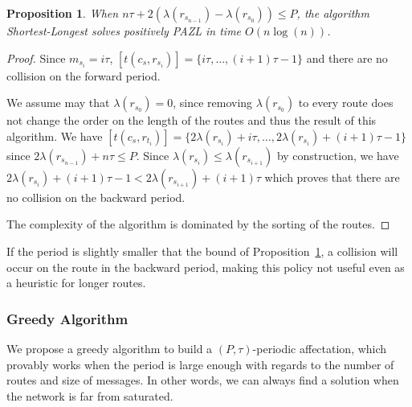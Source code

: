 \documentclass[a4paper,10pt]{article}
\newtheorem{proposition}{Proposition}
\begin{document}
      
      \begin{proposition} When $n\tau + 2(\lambda(r_{s_{n-1}}) - \lambda(r_{s_0})) \leq P$,
      the algorithm Shortest-Longest solves positively PAZL in time $O(n\log(n))$.\label{prop:SL}
      \end{proposition}
      \begin{proof}
       Since $m_{s_i} = i\tau$, $[t(c_s,r_{s_i})] = \{i\tau,\dots, (i+1)\tau -1\}$ and there are no collision on the forward period.
       
       
       We assume may that $\lambda(r_{s_0}) = 0$, since removing $\lambda(r_{s_0})$ to every route does not change the order on the length of the routes and thus the result of this algorithm.
      We have  $[t(c_s,r_{t_i})] = \{2 \lambda(r_{s_i}) + i\tau, \dots,  2 \lambda(r_{s_i}) + (i+1)\tau -1\}$ since $2 \lambda(r_{s_{n-1 }}) + n\tau \leq P$.
       Since $ \lambda(r_{s_i}) \leq  \lambda(r_{s_{i+1}})$ by construction, we have  $2 \lambda(r_{s_i}) + (i+1)\tau -1 < 2 \lambda(r_{s_{i+1}}) + (i+1)\tau$ which proves that there are no collision on the backward period. 
       
       The complexity of the algorithm is dominated by the sorting of the routes. 
      \end{proof}

      
      If the period is slightly smaller that the bound of Proposition~\ref{prop:SL}, a collision will occur on the route in the backward period, making 
      this policy not useful even as a heuristic for longer routes. 

   
    \subsubsection{Greedy Algorithm}
    
    We propose a greedy algorithm to build a $(P,\tau)$-periodic affectation, which provably works when
    the period is large enough with regards to the number of routes and size of messages. In other words, 
    we can always find a solution when the network is far from saturated. 
    
\end{document}
